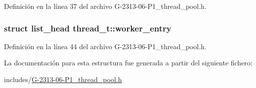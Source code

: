 Definición en la línea 37 del archivo G-\/2313-\/06-\/\+P1\+\_\+thread\+\_\+pool.\+h.

\subsubsection[{\texorpdfstring{worker\+\_\+entry}{worker_entry}}]{\setlength{\rightskip}{0pt plus 5cm}struct {\bf list\+\_\+head} thread\+\_\+t\+::worker\+\_\+entry}\hypertarget{structthread__t_a03432229de426c5ba35d0dfa325491f0}{}\label{structthread__t_a03432229de426c5ba35d0dfa325491f0}


Definición en la línea 44 del archivo G-\/2313-\/06-\/\+P1\+\_\+thread\+\_\+pool.\+h.



La documentación para esta estructura fue generada a partir del siguiente fichero\+:\begin{DoxyCompactItemize}
\item 
includes/\hyperlink{G-2313-06-P1__thread__pool_8h}{G-\/2313-\/06-\/\+P1\+\_\+thread\+\_\+pool.\+h}\end{DoxyCompactItemize}
